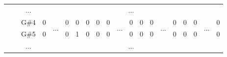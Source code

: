 \documentclass[12pt]{article}
\begin{document}
\begin{table}[!ht]
{\begin{tabular}{clcccccccccccccccccc}
                       & \multicolumn{1}{l|}{} & \multicolumn{1}{c|}{...}  & \multicolumn{17}{c|}{...}                                                                                                                                                                                                                                                                                                                                                                                                                                                                                                                       \\ \cline{3-4} \cline{6-10} \cline{12-14} \cline{16-18} \cline{20-20} 
                       & \multicolumn{1}{l|}{} & \multicolumn{1}{c|}{G\#4} & \multicolumn{1}{c|}{0}    & \multicolumn{1}{c|}{\multirow{2}{*}{...}} & \multicolumn{1}{c|}{0}    & \multicolumn{1}{c|}{0}    & \multicolumn{1}{c|}{0}    & \multicolumn{1}{c|}{0}    & \multicolumn{1}{c|}{0}  & \multicolumn{1}{c|}{\multirow{2}{*}{...}} & \multicolumn{1}{c|}{0}    & \multicolumn{1}{c|}{0}    & \multicolumn{1}{c|}{0}    & \multicolumn{1}{c|}{\multirow{2}{*}{...}} & \multicolumn{1}{c|}{0}  & \multicolumn{1}{c|}{0}  & \multicolumn{1}{c|}{0}  & \multicolumn{1}{c|}{\multirow{2}{*}{...}} & \multicolumn{1}{c|}{0}  \\ \cline{3-4} \cline{6-10} \cline{12-14} \cline{16-18} \cline{20-20} 
                       & \multicolumn{1}{l|}{} & \multicolumn{1}{c|}{G\#5} & \multicolumn{1}{c|}{0}    & \multicolumn{1}{c|}{}                     & \multicolumn{1}{c|}{0}    & \multicolumn{1}{c|}{1}    & \multicolumn{1}{c|}{0}    & \multicolumn{1}{c|}{0}    & \multicolumn{1}{c|}{0}  & \multicolumn{1}{c|}{}                     & \multicolumn{1}{c|}{0}    & \multicolumn{1}{c|}{0}    & \multicolumn{1}{c|}{0}    & \multicolumn{1}{c|}{}                     & \multicolumn{1}{c|}{0}  & \multicolumn{1}{c|}{0}  & \multicolumn{1}{c|}{0}  & \multicolumn{1}{c|}{}                     & \multicolumn{1}{c|}{0}  \\ \cline{3-4} \cline{6-10} \cline{12-14} \cline{16-18} \cline{20-20} 
                       & \multicolumn{1}{l|}{} & \multicolumn{1}{c|}{...}  & \multicolumn{17}{c|}{...}                                                                                                                                                                                                                                                                                                                                                                                                                                                                                                                       \\ \cline{3-4} \cline{6-10} \cline{12-14} \cline{16-18} \cline{20-20} 

\end{tabular}}
\end{table}
\end{document}
